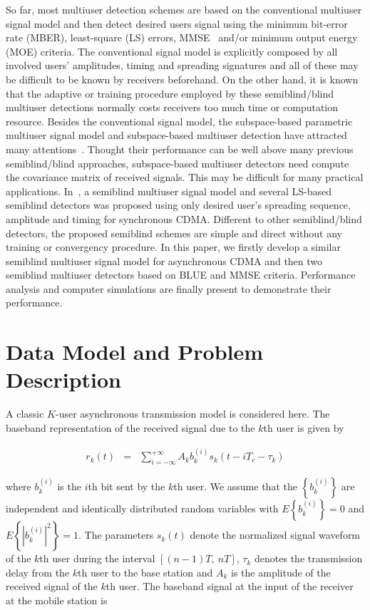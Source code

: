 \documentclass[a4paper,10pt,fleqn, twocolumn]{IEEETran}
\begin{document}
So far, most multiuser detection schemes are based on the
conventional multiuser signal model and then detect desired users
signal using the minimum bit-error rate (MBER), least-square (LS)
errors, MMSE~\cite{Lupa89} and/or minimum output energy (MOE)
criteria. The conventional signal model is explicitly composed by
all involved users' amplitudes, timing and spreading signatures
and all of these may be difficult to be known by receivers
beforehand. On the other hand, it is known that the adaptive or
training procedure employed by these semiblind/blind multiuser
detections normally costs receivers too much time or computation
resource. Besides the conventional signal model, the
subspace-based parametric multiuser signal model and
subspace-based multiuser detection have attracted many
attentions~\cite{Wang98}. Thought their performance can be well
above many previous semiblind/blind approaches, subspace-based
multiuser detectors need compute the covariance matrix of received
signals. This may be difficult for many practical applications.
In~\cite{Wang03d,Wang03e}, a semiblind multiuser signal model and
several LS-based semiblind detectors was proposed using only
desired user's spreading sequence, amplitude and timing for
synchronous CDMA. Different to other semiblind/blind detectors,
the proposed semiblind schemes are simple and direct without any
training or convergency procedure. In this paper, we firstly
develop a similar semiblind multiuser signal model for
asynchronous CDMA and then two semiblind multiuser detectors based
on BLUE and MMSE criteria. Performance analysis and computer
simulations are finally present to demonstrate their performance.

\section{Data Model and Problem Description}
A classic $K$-user asynchronous transmission model is considered
here. The baseband representation of the received signal due to
the $k$th user is given by

\begin{equation}
\begin{array}{rcl}
r_k(t)&=&\sum\limits_{i=-\infty}^{+\infty}A_k b_k^{(i)}
s_k(t-iT_c-\tau_k)
\end{array}
\end{equation}

\noindent where $b_k^{(i)}$ is the $i$th bit sent by the $k$th
user. We assume that the $\left\{b_k^{(i)}\right\}$ are
independent and identically distributed random variables with
$E\left\{b_k^{(i)}\right\}=0$ and
$E\left\{|b_k^{(i)}|^2\right\}=1$. The parameters $s_k(t)$ denote
the normalized signal waveform of the $k$th user during the
interval $[(n-1)T,\ nT]$, $\tau_k$ denotes the transmission delay
from the $k$th user to the base station and $A_k$ is the amplitude
of the received signal of the $k$th user. The baseband signal at
the input of the receiver at the mobile station is
\end{document}
